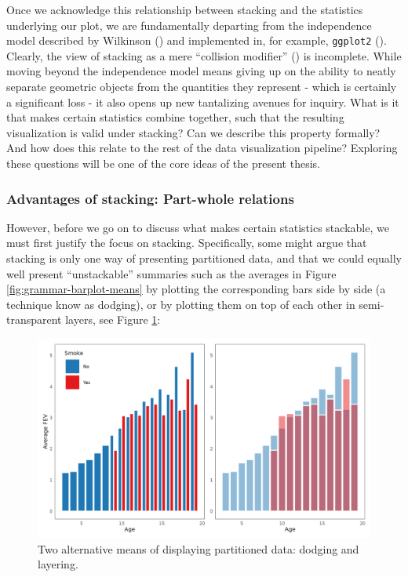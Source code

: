 \documentclass[
]{book}
\theoremstyle{definition}
\theoremstyle{definition}
\theoremstyle{definition}
\theoremstyle{definition}
\theoremstyle{remark}
\begin{document}
Once we acknowledge this relationship between stacking and the statistics underlying our plot, we are fundamentally departing from the independence model described by Wilkinson () and implemented in, for example, \texttt{ggplot2} (). Clearly, the view of stacking as a mere ``collision modifier'' () is incomplete. While moving beyond the independence model means giving up on the ability to neatly separate geometric objects from the quantities they represent - which is certainly a significant loss - it also opens up new tantalizing avenues for inquiry. What is it that makes certain statistics combine together, such that the resulting visualization is valid under stacking? Can we describe this property formally? And how does this relate to the rest of the data visualization pipeline? Exploring these questions will be one of the core ideas of the present thesis.

\subsubsection{Advantages of stacking: Part-whole relations}\label{stacking-part-whole}

However, before we go on to discuss what makes certain statistics stackable, we must first justify the focus on stacking. Specifically, some might argue that stacking is only one way of presenting partitioned data, and that we could equally well present ``unstackable'' summaries such as the averages in Figure \ref{fig:grammar-barplot-means} by plotting the corresponding bars side by side (a technique know as dodging), or by plotting them on top of each other in semi-transparent layers, see Figure \ref{fig:dodging-layering}:

\begin{figure}

{\centering \includegraphics[width=1\linewidth,height=1\textheight]{./figures/grammar-dodging-layering} 

}

\caption{Two alternative means of displaying partitioned data: dodging and layering.}\label{fig:dodging-layering}
\end{figure}
\end{document}
